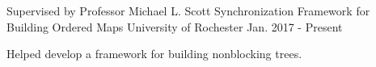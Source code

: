 \begin{cventries}
  \cventry
    {Supervised by Professor Michael L. Scott} %
    {Synchronization Framework for Building Ordered Maps} %
    {University of Rochester} %
    {Jan. 2017 - Present} %
    {
      \begin{cvitems} %
        \item {Helped develop a framework for building nonblocking trees.}
      \end{cvitems}
    }
\end{cventries}
